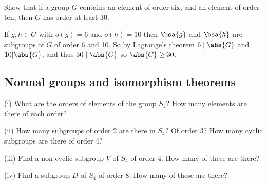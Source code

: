 \begin{problem}
Show that if a group $G$ contains an element of order six, and an element of order ten, then $G$ has order at least 30.
\end{problem}

\begin{solution}[\bf Solution.]
If $g,h\in G$ with $o(g) = 6$ and $o(h) = 10$ then $\bsa{g}$ and $\bsa{h}$ are subgroups of $G$ of order 6 and 10. So by Lagrange's theorem $6\mid \abs{G}$ and $10|\abs{G}$, and thus $30\mid \abs{G}$ so $\abs{G}\geq 30$.
\end{solution}


\subsection{Normal groups and isomorphism theorems}

\begin{problem}\label{que:basic_group_property}
\ben
\item [(i)] What are the orders of elements of the group $S_4$? How many elements are there of each order?
\item [(ii)] How many subgroups of order 2 are there in $S_4$? Of order 3? How many cyclic subgroups are there of order 4?
\item [(iii)] Find a non-cyclic subgroup $V$ of $S_4$ of order 4. How many of these are there?
\item [(iv)] Find a subgroup $D$ of $S_4$ of order 8. How many of these are there?
\een
\end{problem}

